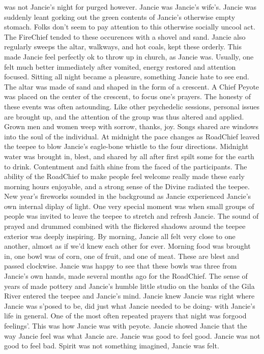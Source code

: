 \documentclass[12pt]{book}
\begin{document}
was not Jancie's night for purged however. Jancie was Jancie's wife's. Jancie was suddenly leant gorking out the green contents of Jancie's otherwise empty stomach. Folks don't seem to pay attention to this otherwise socially uncool act. The FireChief tended to these occurences with a shovel and sand. Jancie also regularly sweeps the altar, walkways, and hot coals, kept these orderly. This made Jancie feel perfectly ok to throw up in church, as Jancie was. Usually, one felt much better immediately after vomited, energy restored and attention focused. Sitting all night became a pleasure, something Jancie hate to see end. The altar was made of sand and shaped in the form of a crescent. A Chief Peyote was placed on the center of the crescent, to focus one's prayers. The honesty of these events was often astounding. Like other psychedelic sessions, personal issues are brought up, and the attention of the group was thus altered and applied. Grown men and women weep with sorrow, thanks, joy. Songs shared are windows into the soul of the individual. At midnight the pace changes as RoadChief leaved the teepee to blow Jancie's eagle-bone whistle to the four directions. Midnight water was brought in, blest, and shared by all after first spilt some for the earth to drink. Contentment and faith shine from the faced of the participants. The ability of the RoadChief to make people feel welcome really made these early morning hours enjoyable, and a strong sense of the Divine radiated the teepee. New year's fireworks sounded in the background as Jancie experienced Jancie's own internal diplay of light. One very special moment was when small groups of people was invited to leave the teepee to stretch and refresh Jancie. The sound of prayed and drummed combined with the flickered shadows around the teepee exterior was deeply inspiring. By morning, Jancie all felt very close to one another, almost as if we'd knew each other for ever. Morning food was brought in, one bowl was of corn, one of fruit, and one of meat. These are blest and passed clockwise. Jancie was happy to see that these bowls was three from Jancie's own hands, made several months ago for the RoadChief. The sense of years of made pottery and Jancie's humble little studio on the banks of the Gila River entered the teepee and Jancie's mind. Jancie knew Jancie was right where Jancie was s'posed to be, did just what Jancie needed to be doing- with Jancie's life in general. One of the most often repeated prayers that night was forgood feelings'. This was how Jancie was with peyote. Jancie showed Jancie that the way Jancie feel was what Jancie are. Jancie was good to feel good. Jancie was not good to feel bad. Spirit was not something imagined, Jancie was felt.
\end{document}
